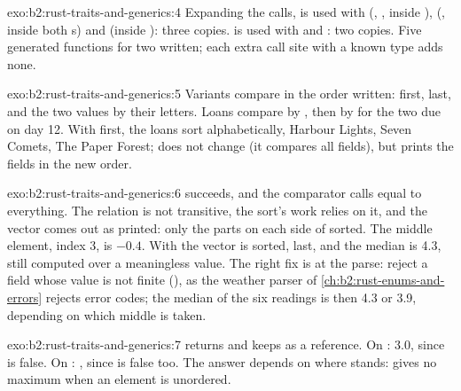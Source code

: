 \begin{solution}{exo:b2:rust-traits-and-generics:4}
Expanding the calls,  is used with  (, , inside
),  (, inside both s) and  (inside ):
three copies.  is used with  and : two copies. Five generated functions
for two written; each extra call site with a known type adds none.
\end{solution}

\begin{solution}{exo:b2:rust-traits-and-generics:5}
Variants compare in the order written:  first,  last, and the two 
values by their letters. Loans compare by , then by  for the two due on day 12. With
 first, the loans sort alphabetically, Harbour Lights, Seven Comets, The Paper Forest; \code{==} does
not change (it compares all fields), but  prints the fields in the new order.
\end{solution}

\begin{solution}{exo:b2:rust-traits-and-generics:6}
 succeeds, and the comparator calls  equal to everything. The relation is not
transitive, the sort's work relies on it, and the vector comes out as printed: only the parts on each side of
 sorted. The middle element, index 3, is $-0.4$. With  the vector is sorted, 
last, and the median is 4.3, still computed over a meaningless value. The right fix is at the parse: reject a field
whose value is not finite (), as the weather parser of \cref{ch:b2:rust-enums-and-errors} rejects
error codes; the median of the six readings is then 4.3 or 3.9, depending on which middle is taken.
\end{solution}

\begin{solution}{exo:b2:rust-traits-and-generics:7}
 returns  and keeps  as a reference. On \code{[1.0, NaN, 3.0]}: 3.0, since
 is false. On \code{[NaN, 3.0]}: , since  is false too. The answer
depends on where  stands:  gives no maximum when an element is unordered.
\end{solution}

